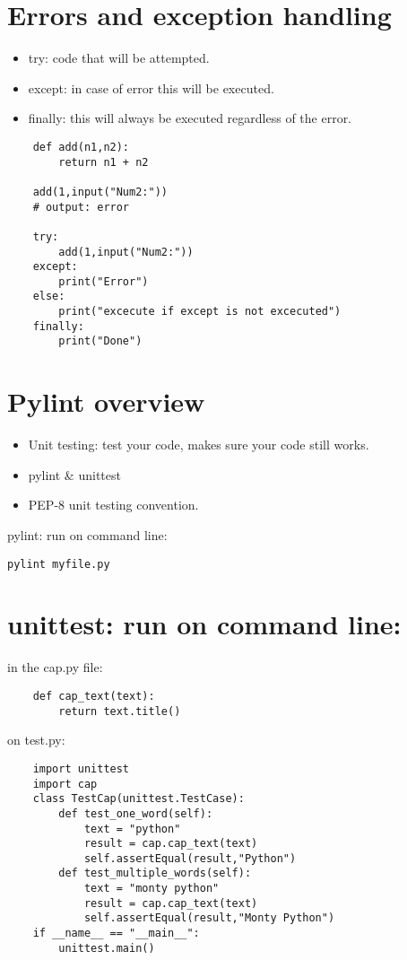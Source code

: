 \section{Errors and exception handling}
\begin{itemize}
    \item try: code that will be attempted. 
    \item except: in case of error this will be executed.
    \item finally: this will always be executed regardless of the error. 
\end{itemize}
\begin{verbatim}
    def add(n1,n2):
        return n1 + n2 

    add(1,input("Num2:"))
    # output: error

    try:
        add(1,input("Num2:"))
    except:
        print("Error")
    else: 
        print("excecute if except is not excecuted")
    finally:
        print("Done")
\end{verbatim}


\section{Pylint overview}
\begin{itemize}
    \item Unit testing: test your code, makes sure your code still works. 
    \item pylint \& unittest 
    \item PEP-8 unit testing convention. 
\end{itemize}
pylint: run on command line: 
\begin{Verbatim}[breaklines=true, breakanywhere=true]
pylint myfile.py 
\end{Verbatim}


\section{unittest: run on command line:} 
in the cap.py file: 
\begin{verbatim}
    def cap_text(text):
        return text.title()
\end{verbatim}
on test.py:
\begin{verbatim}
    import unittest
    import cap 
    class TestCap(unittest.TestCase): 
        def test_one_word(self):
            text = "python"
            result = cap.cap_text(text)
            self.assertEqual(result,"Python")
        def test_multiple_words(self): 
            text = "monty python"
            result = cap.cap_text(text)
            self.assertEqual(result,"Monty Python")
    if __name__ == "__main__":
        unittest.main()
\end{verbatim}
